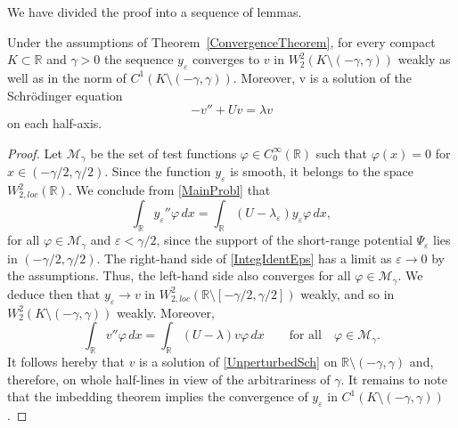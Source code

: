 \documentclass[11pt,english]{amsart}
\begin{document}
We have divided the proof into a sequence of lemmas.

\begin{g_lemma}\label{LemConvergenceC1}
Under the assumptions of Theorem~\ref{ConvergenceTheorem}, for every compact $K\subset \mathbb{R}$ and $\gamma>0$ the sequence $y_\varepsilon$ converges to $v$ in $W_2^2(K\setminus(-\gamma,\gamma))$ weakly as well as in the norm of $C^1(K\setminus(-\gamma,\gamma))$.
Moreover, v is a solution of the Schr\"{o}dinger
equation
\begin{equation}\label{UnperturbedSch}
-v''+Uv=\lambda v
\end{equation}
on each half-axis.
\end{g_lemma}
\begin{proof}
Let $\mathcal{M}_\gamma$ be the set of test functions  $\varphi\in C_0^\infty(\mathbb{R})$ such that $\varphi(x)=0$ for $x\in (-\gamma/2,\gamma/2)$.
Since the function $y_\varepsilon$ is smooth, it belongs to the space $W_{2,loc}^2(\mathbb{R})$.
We conclude from \eqref{MainProbl} that
\begin{equation}\label{IntegIdentEps}
    \int_\mathbb{R} y_\varepsilon''\varphi\,dx=\int_\mathbb{R} (U-\lambda_\varepsilon)y_\varepsilon\varphi\,dx,
\end{equation}
for all  $\varphi\in \mathcal{M}_\gamma$ and $\varepsilon<\gamma/2$, since the support of the short-range potential $\Psi_\varepsilon$ lies in $(-\gamma/2,\gamma/2)$.
The right-hand side of \eqref{IntegIdentEps} has a limit as $\varepsilon\to 0$ by the assumptions.
Thus, the left-hand side also converges for all  $\varphi\in \mathcal{M}_\gamma$.
We deduce then that $y_\varepsilon \to v$ in $W_{2, loc}^2(\mathbb{R}\setminus[-\gamma/2,\gamma/2])$ weakly, and so
in $W_2^2(K\setminus(-\gamma,\gamma))$ weakly.
Moreover,
\begin{equation*}\label{IntegIdent}
    \int_\mathbb{R} v''\varphi\,dx=\int_\mathbb{R} (U-\lambda)v\varphi\,dx \qquad\text{for all}\quad \varphi\in \mathcal{M}_\gamma.
\end{equation*}
It follows hereby that $v$ is a solution of \eqref{UnperturbedSch} on $\mathbb{R}\setminus(-\gamma,\gamma)$ and, therefore,
on whole half-lines in view of the arbitrariness of $\gamma$.
It remains to note that the imbedding theorem implies the convergence of $y_\varepsilon$ in $C^1(K\setminus(-\gamma,\gamma))$.
\end{proof}
\end{document}
